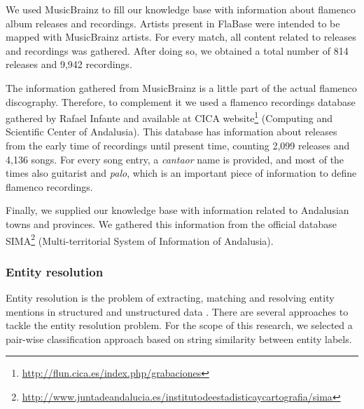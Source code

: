 We used MusicBrainz to fill our knowledge base with information about flamenco album releases and recordings. Artists present in FlaBase were intended to be mapped with MusicBrainz artists. For every match, all content related to releases and recordings was gathered. After doing so, we obtained a total number of 814 releases and 9,942 recordings. 

The information gathered from MusicBrainz is a little part of the actual flamenco discography. Therefore, to complement it we used a flamenco recordings database gathered by Rafael Infante and available at CICA website\footnote{\url{http://flun.cica.es/index.php/grabaciones}} (Computing and Scientific Center of Andalusia). This database has information about releases from the early time of recordings until present time, counting 2,099 releases and 4,136 songs. For every song entry, a \textit{cantaor} name is provided, and most of the times also guitarist and \textit{palo}, which is an important piece of information to define flamenco recordings.

Finally, we supplied our knowledge base with information related to Andalusian towns and provinces. We gathered this information from the official database SIMA\footnote{\url{http://www.juntadeandalucia.es/institutodeestadisticaycartografia/sima}} (Multi-territorial System of Information of Andalusia).%


\subsubsection{Entity resolution}
\label{sec:musicology:entity_resolution}

Entity resolution is the problem of extracting, matching and resolving entity mentions in structured and unstructured data \citep{Getoor2012}. There are several approaches to tackle the entity resolution problem. For the scope of this research, we selected a pair-wise classification approach based on string similarity between entity labels.

